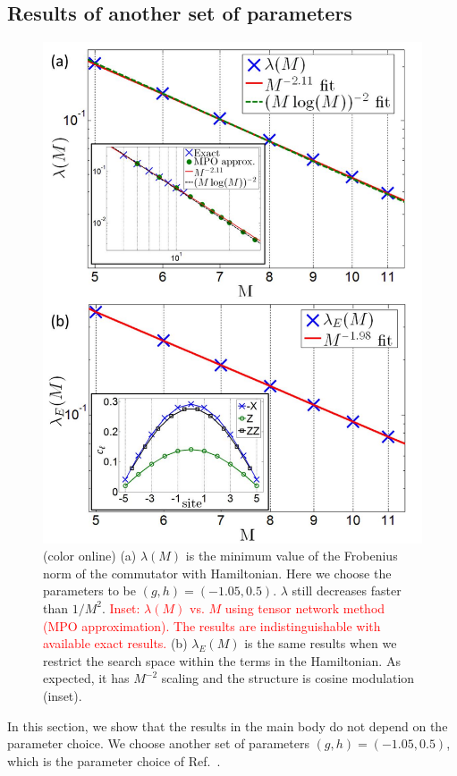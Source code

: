 \documentclass[twocolumn,superscriptaddress, prl,showpacs]{revtex4-1}
\newcommand{\addr}[1]{\textcolor{red}{#1}}
\begin{document}
\subsection{Results of another set of parameters}
\begin{figure}
\includegraphics[width=1.0\linewidth]{fig_hamiltonian_modified_other.pdf}
\centering
\caption{(color online) (a) $\lambda(M)$ is the minimum value of the Frobenius norm of the commutator with Hamiltonian.
Here we choose the parameters to be $(g,h) = (-1.05, 0.5)$. $\lambda$ still decreases faster than $1/M^2$.
\addr{Inset: $\lambda(M)$ vs. $M$ using tensor network method (MPO approximation). The results are indistinguishable with available exact results.}
(b) $\lambda_E(M)$ is the same results when we restrict the search space within the terms in the Hamiltonian.
As expected, it has $M^{-2}$ scaling and the structure is cosine modulation (inset).}
\label{fig:hamiltonian_other}
\end{figure}
In this section, we show that the results in the main body do not depend on the parameter choice.
We choose another set of parameters $(g,h) = (-1.05, 0.5)$, which is the parameter choice of Ref.~.
\end{document}
